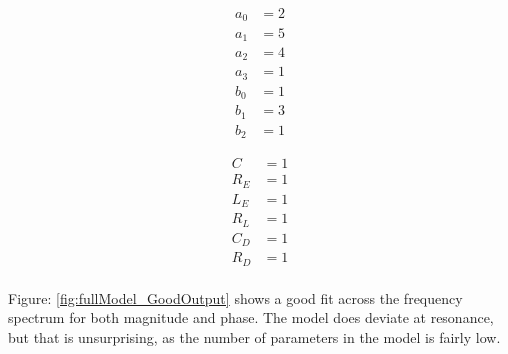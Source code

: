 \begin{multicols}{2}
    \mbox{}\vfill
    \begin{equation}
        \label{equ:fullModel_GoodInputCoeff}
        \begin{split}
             a_0 &= 2 \\
             a_1 &= 5 \\
             a_2 &= 4 \\
             a_3 &= 1 \\
             b_0 &= 1 \\
             b_1 &= 3 \\
             b_2 &= 1
        \end{split}
    \end{equation}

    \mbox{}\vfill
    \columnbreak

    \mbox{}\vfill
    \begin{equation}
        \label{equ:fullModel_GoodInputParams}
        \begin{split}
             C   &= 1 \\
             R_E &= 1 \\
             L_E &= 1 \\
             R_L &= 1 \\
             C_D &= 1 \\
             R_D &= 1 \\
        \end{split}
    \end{equation}
    \mbox{}\vfill
\end{multicols}



Figure: \ref{fig:fullModel_GoodOutput} shows a good fit across the frequency spectrum for both magnitude and phase. The model does deviate at resonance, but that is unsurprising, as the number of parameters in the model is fairly low.


